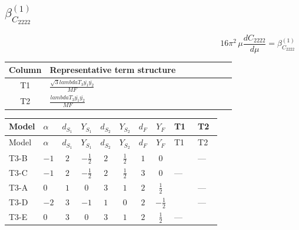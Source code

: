 \documentclass[8pt]{article}
\begin{document}
\begin{landscape}
\section*{$\beta_{C_{2222}}^{(1)}$}
\[16\pi^2\,\mu\frac{d C_{2222}}{d\mu}=\beta_{C_{2222}}^{(1)}\]
\begin{center}
\begin{tabular}{@{}c >{\raggedright\arraybackslash}p{0.82\linewidth}@{}}
\toprule
Column & Representative term structure \\
\midrule
T1 & \(\displaystyle \frac{\sqrt{3} lambdaT_{3} \overline{y_{1}} \overline{y_{2}}}{MF}\) \\
\midrule
T2 & \(\displaystyle \frac{lambdaT_{3} \overline{y_{1}} \overline{y_{2}}}{MF}\) \\
\midrule
\bottomrule
\end{tabular}
\end{center}
\smallskip
\tiny
\begin{longtable}{@{}llcccccc >{\raggedright\arraybackslash}p{0.21\linewidth} >{\raggedright\arraybackslash}p{0.21\linewidth}@{}}
\toprule
Model & $\alpha$ & $d_{S_1}$ & $Y_{S_1}$ & $d_{S_2}$ & $Y_{S_2}$ & $d_F$ & $Y_F$ & T1 & T2 \\
\midrule
\endfirsthead
\toprule
Model & $\alpha$ & $d_{S_1}$ & $Y_{S_1}$ & $d_{S_2}$ & $Y_{S_2}$ & $d_F$ & $Y_F$ & T1 & T2 \\
\midrule
\endhead
T3-B & $-1$ & $2$ & $-\frac{1}{2}$ & $2$ & $\frac{1}{2}$ & $1$ & $0$ & \scriptsize\adjustbox{max width=\linewidth}{$\begin{gathered} - \frac{2 \sqrt{3} lambdaT_{3} \overline{y_{1}} \overline{y_{2}}}{3 MF}\end{gathered}$} & --- \\
\midrule
T3-C & $-1$ & $2$ & $-\frac{1}{2}$ & $2$ & $\frac{1}{2}$ & $3$ & $0$ & --- & \scriptsize\adjustbox{max width=\linewidth}{$\begin{gathered} \frac{4 lambdaT_{3} \overline{y_{1}} \overline{y_{2}}}{3 MF}\end{gathered}$} \\
\midrule
T3-A & $0$ & $1$ & $0$ & $3$ & $1$ & $2$ & $\frac{1}{2}$ & \scriptsize\adjustbox{max width=\linewidth}{$\begin{gathered} - \frac{2 \sqrt{3} lambdaT_{3} \overline{y_{1}} \overline{y_{2}}}{3 MF}\end{gathered}$} & --- \\
\midrule
T3-D & $-2$ & $3$ & $-1$ & $1$ & $0$ & $2$ & $-\frac{1}{2}$ & \scriptsize\adjustbox{max width=\linewidth}{$\begin{gathered} - \frac{2 \sqrt{3} lambdaT_{3} \overline{y_{1}} \overline{y_{2}}}{3 MF}\end{gathered}$} & --- \\
\midrule
T3-E & $0$ & $3$ & $0$ & $3$ & $1$ & $2$ & $\frac{1}{2}$ & --- & \scriptsize\adjustbox{max width=\linewidth}{$\begin{gathered} \frac{2 lambdaT_{3} \overline{y_{1}} \overline{y_{2}}}{MF}\end{gathered}$} \\
\midrule
\bottomrule
\end{longtable}
\clearpage

\end{landscape}
\end{document}

